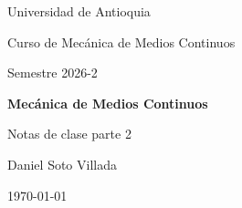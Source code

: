 \documentclass[12pt,letterpaper,oneside]{report}
\begin{document}
\begin{titlepage}
    \centering
    {\Large Universidad de Antioquia\par}
    \vspace{1cm}
    {\large Curso de Mecánica de Medios Continuos\par}
    {\large Semestre 2026-2\par}

    \vfill

    {\Huge\bfseries Mecánica de Medios Continuos\par}
    \vspace{1.5cm}
    {\Large Notas de clase parte 2\par}

    \vfill

    {\large Daniel Soto Villada\par}
    \vspace{1cm}
    {\large \today\par}
\end{titlepage}

\begingroup
\setlength{\parskip}{0pt}
\tableofcontents
\endgroup













\end{document}
